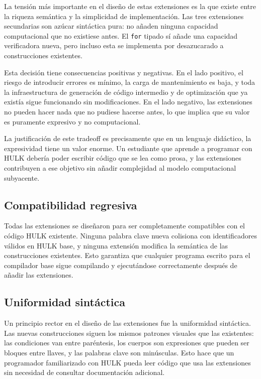 \documentclass[12pt, a4paper]{article}
\begin{document}
La tensión más importante en el diseño de estas extensiones es la que existe entre la riqueza semántica y la simplicidad de implementación. Las tres extensiones secundarias son azúcar sintáctica pura: no añaden ninguna capacidad computacional que no existiese antes. El \texttt{for} tipado sí añade una capacidad verificadora nueva, pero incluso esta se implementa por desazucarado a construcciones existentes.

Esta decisión tiene consecuencias positivas y negativas. En el lado positivo, el riesgo de introducir errores es mínimo, la carga de mantenimiento es baja, y toda la infraestructura de generación de código intermedio y de optimización que ya existía sigue funcionando sin modificaciones. En el lado negativo, las extensiones no pueden hacer nada que no pudiese hacerse antes, lo que implica que su valor es puramente expresivo y no computacional.

La justificación de este tradeoff es precisamente que en un lenguaje didáctico, la expresividad tiene un valor enorme. Un estudiante que aprende a programar con HULK debería poder escribir código que se lea como prosa, y las extensiones contribuyen a ese objetivo sin añadir complejidad al modelo computacional subyacente.

\subsection{Compatibilidad regresiva}

Todas las extensiones se diseñaron para ser completamente compatibles con el código HULK existente. Ninguna palabra clave nueva colisiona con identificadores válidos en HULK base, y ninguna extensión modifica la semántica de las construcciones existentes. Esto garantiza que cualquier programa escrito para el compilador base sigue compilando y ejecutándose correctamente después de añadir las extensiones.

\subsection{Uniformidad sintáctica}

Un principio rector en el diseño de las extensiones fue la uniformidad sintáctica. Las nuevas construcciones siguen los mismos patrones visuales que las existentes: las condiciones van entre paréntesis, los cuerpos son expresiones que pueden ser bloques entre llaves, y las palabras clave son minúsculas. Esto hace que un programador familiarizado con HULK pueda leer código que usa las extensiones sin necesidad de consultar documentación adicional.
\end{document}
